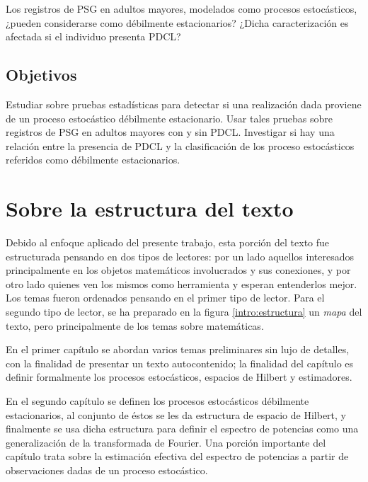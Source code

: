 Los registros de PSG en adultos mayores, modelados como procesos estocásticos, ¿pueden considerarse como débilmente estacionarios?
%
¿Dicha caracterización es afectada si el individuo presenta PDCL?


\subsection*{Objetivos}

Estudiar sobre pruebas estadísticas para detectar si una realización dada proviene de un proceso estocástico débilmente estacionario.
%
Usar tales pruebas sobre registros de PSG en adultos mayores con y sin PDCL.
%
Investigar si hay una relación entre la presencia de PDCL y la clasificación de los proceso estocásticos referidos como débilmente estacionarios.

\section*{Sobre la estructura del texto}

Debido al enfoque aplicado del presente trabajo, esta porción del texto fue estructurada pensando en dos tipos de lectores: por un lado aquellos interesados principalmente en los objetos matemáticos involucrados y sus conexiones, y por otro lado quienes ven los mismos como herramienta y esperan entenderlos mejor.
%
Los temas fueron ordenados pensando en el primer tipo de lector.
%
Para el segundo tipo de lector, se ha preparado en la figura \ref{intro:estructura} un \textit{mapa} del texto, pero principalmente de los temas sobre matemáticas.

En el primer capítulo se abordan varios temas preliminares sin lujo de detalles, con la finalidad de presentar un texto autocontenido;
%
la finalidad del capítulo es definir formalmente los procesos estocásticos, espacios de Hilbert y estimadores.

En el segundo capítulo se definen los procesos estocásticos débilmente estacionarios, al conjunto de éstos se les da estructura de espacio de Hilbert, y finalmente se usa dicha estructura para definir el espectro de potencias como una generalización de la transformada de Fourier.
%
Una porción importante del capítulo trata sobre la estimación efectiva del espectro de potencias a partir de observaciones dadas de un proceso estocástico.

